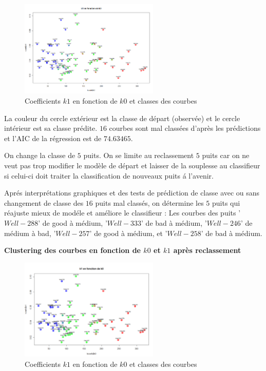 \documentclass[12pt]{article}
\begin{document}
\begin{figure}[H]
 \centering %
	\includegraphics[width=250px]{clustering}
  \caption{\label{fig:k0_k1} Coefficients $k1$ en fonction de $k0$ et classes des courbes}
\end{figure}

La couleur du cercle ext\'erieur est la classe de d\'epart (observ\'ee) et le cercle int\'erieur est sa classe pr\'edite.
\newline 
$16$ courbes sont mal class\'ees d'apr\`es les pr\'edictions et l'AIC de la r\'egression est de $74.63465$. 


\newpage 

On change la classe de $5$ puits. 
\newline
On se limite au reclassement $5$ puits car on ne veut pas trop modifier le mod\`ele de d\'epart et laisser de la souplesse au classifieur si celui-ci doit traiter la classification de nouveaux puits \'a l'avenir.
\newline

Apr\'es interpr\'etations graphiques et des tests de pr\'ediction de classe avec ou sans changement de classe des $16$ puits mal class\'es, on d\'etermine les $5$ puits qui r\'eajuste mieux de mod\'ele et am\'eliore le classifieur :
\newline
Les courbes des puits '$Well-288$' de good à médium, '$Well-333$' de bad à médium, '$Well-246$' de médium à bad, '$Well-257$' de good à médium, et '$Well-258$' de bad à médium.

\textbf{Clustering des courbes en fonction de $k0$ et $k1$ apr\`es reclassement}

\begin{figure}[H]
 \centering %
	\includegraphics[width=250px]{clustering2}
  \caption{\label{fig:k0_k1} Coefficients $k1$ en fonction de $k0$ et classes des courbes}
\end{figure}
\end{document}
